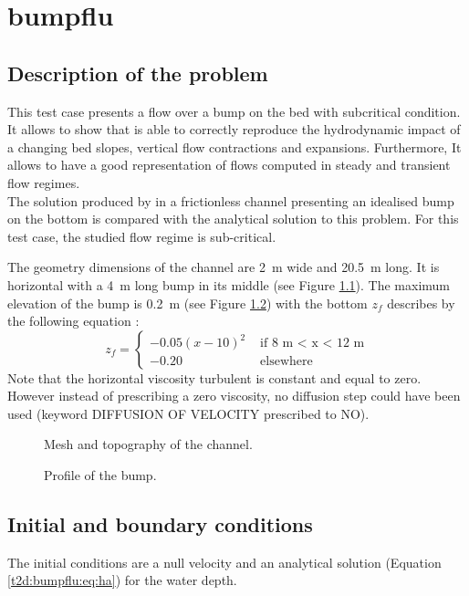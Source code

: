 \chapter{bumpflu}

\section{Description of the problem}
\bigskip
This test case presents a flow over a bump on the bed with subcritical condition.
It allows to show that  is able to correctly reproduce 
the hydrodynamic impact of a changing bed slopes, vertical flow 
contractions and expansions. Furthermore, It allows to have a good 
representation of flows computed in steady and transient flow regimes. \\
The solution produced by  in a frictionless channel 
presenting an idealised bump on the bottom  is compared with 
the analytical solution to this problem. For this test case, 
the studied flow regime is sub-critical.

\bigskip
The geometry dimensions of the channel are 2~m wide and 20.5~m long. 
It is horizontal with a 4~m long bump in its middle 
(see Figure \ref{t2d:bumpflu:fig:baty}). The maximum elevation of 
the bump is 0.2~m (see Figure \ref{t2d:bumpflu:fig:profil}) with 
the bottom $z_f$ describes by the following equation :
\begin{equation*}
z_f = \left\{
\begin{array}{rl}
  -0.05(x-10)^2 & \text{ if 8 m < x < 12 m} \\
-0.20 & \text{ elsewhere}
\end{array}
\right.
\end{equation*}
Note that the horizontal viscosity turbulent is constant and equal to zero. 
However instead of prescribing a zero viscosity, no diffusion step could 
have been used (keyword DIFFUSION OF VELOCITY prescribed to NO).
\begin{figure}[!htbp]
 \centering
 \caption{Mesh and topography of the channel.}
 \label{t2d:bumpflu:fig:baty}
\end{figure}
\begin{figure}[!htbp]
 \centering
 \caption{Profile of the bump.}
 \label{t2d:bumpflu:fig:profil}
\end{figure}

\section{Initial and boundary conditions}
\bigskip
The initial conditions are a null velocity and an analytical solution 
(Equation \eqref{t2d:bumpflu:eq:ha}) for the water depth.

